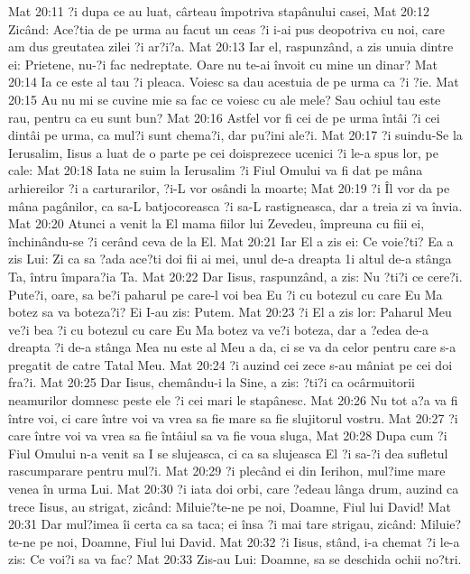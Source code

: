Mat 20:11  ?i dupa ce au luat, cârteau împotriva stapânului casei,
Mat 20:12  Zicând: Ace?tia de pe urma au facut un ceas ?i i-ai pus deopotriva cu noi, care am dus greutatea zilei ?i ar?i?a.
Mat 20:13  Iar el, raspunzând, a zis unuia dintre ei: Prietene, nu-?i fac nedreptate. Oare nu te-ai învoit cu mine un dinar?
Mat 20:14  Ia ce este al tau ?i pleaca. Voiesc sa dau acestuia de pe urma ca ?i ?ie.
Mat 20:15  Au nu mi se cuvine mie sa fac ce voiesc cu ale mele? Sau ochiul tau este rau, pentru ca eu sunt bun?
Mat 20:16  Astfel vor fi cei de pe urma întâi ?i cei dintâi pe urma, ca mul?i sunt chema?i, dar pu?ini ale?i.
Mat 20:17  ?i suindu-Se la Ierusalim, Iisus a luat de o parte pe cei doisprezece ucenici ?i le-a spus lor, pe cale:
Mat 20:18  Iata ne suim la Ierusalim ?i Fiul Omului va fi dat pe mâna arhiereilor ?i a carturarilor, ?i-L vor osândi la moarte;
Mat 20:19  ?i Îl vor da pe mâna pagânilor, ca sa-L batjocoreasca ?i sa-L rastigneasca, dar a treia zi va învia.
Mat 20:20  Atunci a venit la El mama fiilor lui Zevedeu, împreuna cu fiii ei, închinându-se ?i cerând ceva de la El.
Mat 20:21  Iar El a zis ei: Ce voie?ti? Ea a zis Lui: Zi ca sa ?ada ace?ti doi fii ai mei, unul de-a dreapta 1i altul de-a stânga Ta, întru împara?ia Ta.
Mat 20:22  Dar Iisus, raspunzând, a zis: Nu ?ti?i ce cere?i. Pute?i, oare, sa be?i paharul pe care-l voi bea Eu ?i cu botezul cu care Eu Ma botez sa va boteza?i? Ei I-au zis: Putem.
Mat 20:23  ?i El a zis lor: Paharul Meu ve?i bea ?i cu botezul cu care Eu Ma botez va ve?i boteza, dar a ?edea de-a dreapta ?i de-a stânga Mea nu este al Meu a da, ci se va da celor pentru care s-a pregatit de catre Tatal Meu.
Mat 20:24  ?i auzind cei zece s-au mâniat pe cei doi fra?i.
Mat 20:25  Dar Iisus, chemându-i la Sine, a zis: ?ti?i ca ocârmuitorii neamurilor domnesc peste ele ?i cei mari le stapânesc.
Mat 20:26  Nu tot a?a va fi între voi, ci care între voi va vrea sa fie mare sa fie slujitorul vostru.
Mat 20:27  ?i care între voi va vrea sa fie întâiul sa va fie voua sluga,
Mat 20:28  Dupa cum ?i Fiul Omului n-a venit sa I se slujeasca, ci ca sa slujeasca El ?i sa-?i dea sufletul rascumparare pentru mul?i.
Mat 20:29  ?i plecând ei din Ierihon, mul?ime mare venea în urma Lui.
Mat 20:30  ?i iata doi orbi, care ?edeau lânga drum, auzind ca trece Iisus, au strigat, zicând: Miluie?te-ne pe noi, Doamne, Fiul lui David!
Mat 20:31  Dar mul?imea îi certa ca sa taca; ei însa ?i mai tare strigau, zicând: Miluie?te-ne pe noi, Doamne, Fiul lui David.
Mat 20:32  ?i Iisus, stând, i-a chemat ?i le-a zis: Ce voi?i sa va fac?
Mat 20:33  Zis-au Lui: Doamne, sa se deschida ochii no?tri.
